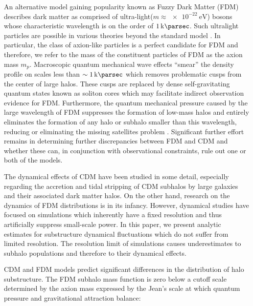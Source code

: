 \documentclass[usenatbib]{mnras}
\newcommand{\poweV}[1]{\SI{e#1}{\electronvolt}}
\begin{document}
\par
	An alternative model gaining popularity known as Fuzzy Dark Matter (FDM) describes dark matter as comprised of ultra-light($m \approx \poweV{-22}$) bosons whose characteristic wavelength is on the order of $\SI{1}{\kilo\parsec}$. Such ultralight particles are possible in various theories beyond the standard model \citep{axion_cosmology}. In particular, the class of axion-like particles is a perfect candidate for FDM and therefore, we refer to the mass of the constituent particles of FDM as the axion mass $m_p$. Macroscopic quantum mechanical wave effects “smear” the density profile on scales less than $\sim \SI{1}{\kilo\parsec}$ which removes problematic cusps from the center of large halos. These cusps are replaced by dense self-gravitating quantum states known as soliton cores which may facilitate indirect observation evidence for FDM. Furthermore, the quantum mechanical pressure caused by the large wavelength of FDM suppresses the formation of low-mass halos and entirely eliminates the formation of any halo or subhalo smaller than this wavelength, reducing or eliminating the missing satellites problem \citep{numerical-Schrodinger}. Significant further effort remains in determining further discrepancies between FDM and CDM and whether these can, in conjunction with observational constraints, rule out one or both of the models.
 
\par
        The dynamical effects of CDM have been studied in some detail, especially regarding the accretion and tidal stripping of CDM subhalos by large galaxies and their associated dark matter halos. On the other hand, research on the dynamics of FDM distributions is in its infancy. However, dynamical studies have focused on simulations which inherently have a fixed resolution and thus artificially suppress small-scale power. In this paper, we present analytic estimates for substructure dynamical fluctuations which do not suffer from limited resolution. The resolution limit of simulations causes underestimates to subhalo populations and therefore to their dynamical effects. 
\par 
	CDM and FDM models predict significant differences in the distribution of halo substructure. The FDM subhalo mass function is zero below a cutoff scale determined by the axion mass expressed by the Jean’s scale at which quantum pressure and gravitational attraction balance:
\setlength{\belowdisplayskip}{4pt} \setlength{\belowdisplayshortskip}{4pt}
\setlength{\abovedisplayskip}{4pt} \setlength{\abovedisplayshortskip}{4pt}
\end{document}
